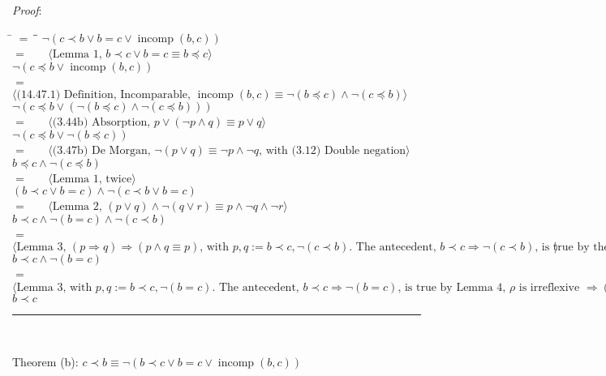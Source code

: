 \documentclass[12pt, fleqn, leqno]{article}
\newcommand{\lgap}{2pt}                             %
\newcommand{\mymathindent}{24pt}                    %
\newcommand{\impl}{\ensuremath{\Rightarrow}}        %
\newcommand{\myqed}{\rule[-.23ex]{1.2ex}{2.0ex}}
\newcommand{\myqedtab}{\hspace{384pt}}              %
\newcommand{\Gll} {\langle}                         %
\newcommand{\Ggg} {\rangle}                         %
\newcommand{\Hint}[1]     {\ \ \ $\Gll              \mbox{#1} \Ggg$ }   %
\DeclareMathOperator{\incomp}{incomp}
\begin{document}
\textit{Proof}:
\begin{tabbing}
\hspace{\mymathindent} \= $= \;$ \= \myqedtab \= \kill
	\> \>  $\lnot(c \prec b \lor b = c \lor \incomp(b, c))$\\
	\> $=$  \>  \Hint{Lemma 1, $b \prec c \lor b = c \equiv b \preceq c$}\\[\lgap]
	\> \>   $\lnot(c \preceq b \lor \incomp(b, c))$\\
	\> $=$  \>  \Hint{(14.47.1) Definition, Incomparable, $\incomp(b, c) \equiv \lnot (b \preceq c) \land \lnot (c \preceq b)$}\\[\lgap]
	\> \>   $\lnot (c \preceq b \lor (\lnot (b \preceq c) \land \lnot (c \preceq b)))$\\
	\> $=$  \>  \Hint{(3.44b) Absorption, $p \lor (\lnot p \land q) \equiv p \lor q$}\\[\lgap]
	\> \>   $\lnot (c \preceq b \lor \lnot (b \preceq c))$\\
	\> $=$  \>  \Hint{(3.47b) De Morgan, $\lnot (p \lor q) \equiv \lnot p \land \lnot q$, with (3.12) Double negation}\\[\lgap]
	\> \>   $b \preceq c \land \lnot(c \preceq b)$\\
	\> $=$  \>  \Hint{Lemma 1, twice}\\[\lgap]
	\> \>   $(b \prec c \lor b = c) \land \lnot (c \prec b \lor b = c)$\\
	\> $=$  \>  \Hint{Lemma 2, $(p \lor q) \land \lnot (q \lor r) \equiv p \land \lnot q \land \lnot r$}\\[\lgap]
	\> \>   $b \prec c \land \lnot (b = c) \land \lnot (c \prec b)$\\
	\> $=$  \>  \Hint{Lemma 3, $(p \impl q) \impl (p \land q \equiv p)$, with $p, q := b \prec c, \lnot (c \prec b)$. The antecedent, $b \prec c \impl \lnot (c \prec b)$, is true by the definition of asymmetry and the fact that strict orders are asymmetric.}\\[\lgap]
	\> \>  $b \prec c \land \lnot (b = c)$\\
	\> $=$  \>  \Hint{Lemma 3, with $p, q := b \prec c, \lnot (b = c)$. The antecedent, $b \prec c \impl \lnot (b = c)$, is true by Lemma 4, $\rho$ is irreflexive $\impl (b \rho c \impl \lnot (b = c))$, and the fact that strict orders are irreflexive.}\\[\lgap]
	\> \>   $b \prec c$ \quad \myqed\\
\end{tabbing}

Theorem (b): $c \prec b \equiv \lnot(b \prec c \lor b = c \lor \incomp(b, c))$
\end{document}

